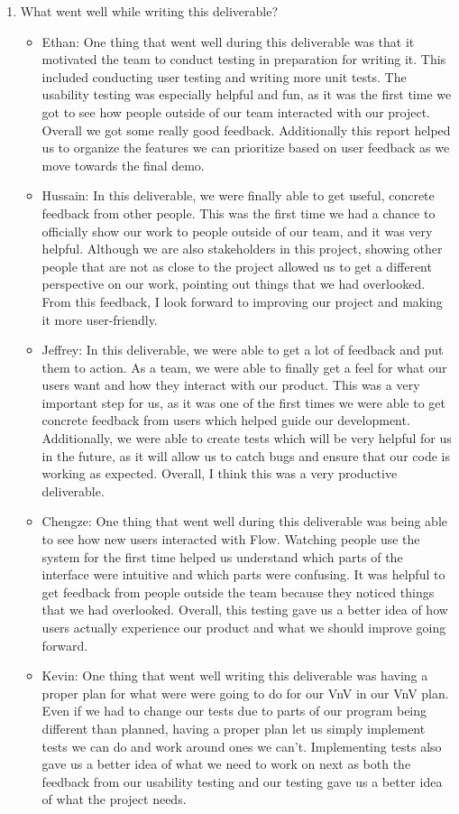\documentclass[12pt, titlepage]{article}
\begin{document}
\begin{enumerate}
  \item What went well while writing this deliverable?
  \begin{itemize}
    \item Ethan: One thing that went well during this deliverable was that it
      motivated the team to conduct testing in preparation for writing it. This
      included conducting user testing and writing more unit tests. The
      usability testing was especially helpful and fun, as it was the first
      time we got to see how people outside of our team interacted with our
      project. Overall we got some really good feedback. Additionally this
      report helped us to organize the features we can prioritize based on user
      feedback as we move towards the final demo.
    \item Hussain: In this deliverable, we were finally able to get useful,
    concrete feedback from other people. This was the first time we had a
    chance to officially show our work to people outside of our team, and it
    was very helpful. Although we are also stakeholders in this project, showing
    other people that are not as close to the project allowed us to get a
    different perspective on our work, pointing out things that we had overlooked.
    From this feedback, I look forward to improving our project and making it
    more user-friendly.
    \item Jeffrey: In this deliverable, we were able to get a lot of feedback and
    put them to action. As a team, we were able to finally get a feel for what
    our users want and how they interact with our product. This was a very important
    step for us, as it was one of the first times we were able to get concrete feedback
    from users which helped guide our development. Additionally, we were able to create
    tests which will be very helpful for us in the future, as it will allow us to catch bugs and
    ensure that our code is working as expected. Overall, I think this was a very productive
    deliverable.
    \item Chengze: One thing that went well during this deliverable was being able to
    see how new users interacted with Flow. Watching people use the system for the
    first time helped us understand which parts of the interface were intuitive and
    which parts were confusing. It was helpful to get feedback from people outside
    the team because they noticed things that we had overlooked. Overall, this
    testing gave us a better idea of how users actually experience our product and
    what we should improve going forward.
    \item Kevin: One thing that went well writing this deliverable was having
     a proper plan for what were were going to do for our VnV in our VnV
      plan. Even if we had to change our tests due to parts of our program
       being different than planned, having a proper plan let us simply
        implement tests we can do and work around ones we can't. Implementing
         tests also gave us a better idea of what we need to work on next as
          both the feedback from our usability testing and our testing gave
           us a better idea of what the project needs.


\end{itemize}
\end{enumerate}
\end{document}
